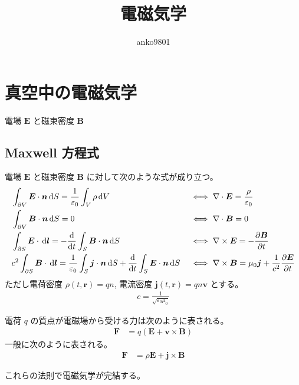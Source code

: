 \documentclass[uplatex,dvipdfmx,a4paper,11pt]{jlreq}
\title{電磁気学}
\author{anko9801}
\newcommand{\EE}{\bm{E}}
\newcommand{\BB}{\bm{B}}
\newcommand{\rr}{\bm{r}}
\newcommand{\vnabla}{\mathbf{\nabla}}
\numberwithin{equation}{section}
\theoremstyle{definition}
\begin{document}
\maketitle
\tableofcontents
\clearpage



\section{真空中の電磁気学}
電場 $\EE$ と磁束密度 $\BB$
\subsection{Maxwell 方程式}
\begin{definition}
  電場 $\EE$ と磁束密度 $\BB$ に対して次のような式が成り立つ。
  \begin{align}
     & \int_{\partial V}\EE\cdot\bm{n}\dl{S} = \frac{1}{\varepsilon_0}\int_V\rho\dl{V}                                                       &  & \iff \vnabla\cdot\EE  = \frac{\rho}{\varepsilon_0}                               \\
     & \int_{\partial V}\BB\cdot\bm{n}\dl{S} = 0                                                                                             &  & \iff \vnabla\cdot\BB  = 0                                                        \\
     & \int_{\partial S}\EE\cdot\dl{\bm{l}} = -\diff{}{t}\int_S\BB\cdot\bm{n}\dl{S}                                                          &  & \iff \vnabla\times\EE = -\diffp{\BB}{t}                                          \\
     & c^2\int_{\partial S}\BB\cdot\dl{\bm{l}} = \frac{1}{\varepsilon_0}\int_S\bm{j}\cdot\bm{n}\dl{S} + \diff{}{t}\int_S\EE\cdot\bm{n}\dl{S} &  & \iff \vnabla\times\BB = \mu_0\bm{j} + \frac{1}{c^2}\diffp{\EE}{t} \label{Ampere}
  \end{align}
  ただし電荷密度 $\rho(t, \rr) = qn$, 電流密度 $\bm{j}(t, \rr) = qn\bm{v}$ とする。
  \begin{align}
    c = \frac{1}{\sqrt{\varepsilon_0\mu_0}}
  \end{align}
\end{definition}
\begin{definition}[Lorentz 力]
  電荷 $q$ の質点が電磁場から受ける力は次のように表される。
  \begin{align}
    \bm{F} & = q(\EE + \bm{v}\times\BB)
  \end{align}
  一般に次のように表される。
  \begin{align}
    \bm{F} & = \rho\EE + \bm{j}\times\BB
  \end{align}
\end{definition}
これらの法則で電磁気学が完結する。
\end{document}

